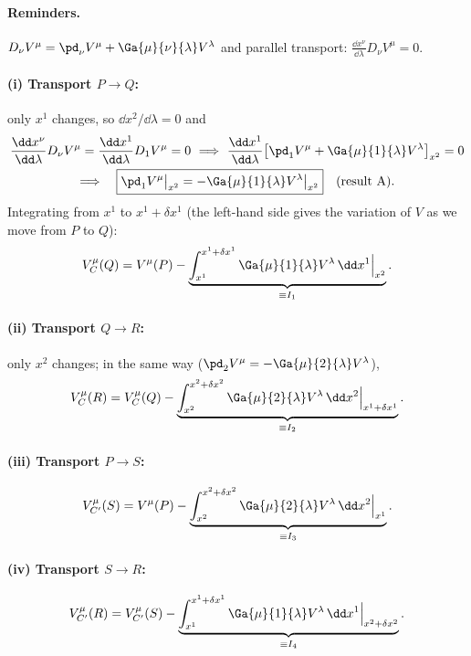 \paragraph{Reminders.} $D_\nu V^\mu=\pd_\nu V^\mu+\Ga{\mu}{\nu}{\lambda}V^\lambda$ and parallel transport: $\frac{\dd x^\nu}{\dd\lambda}D_\nu V^\mu=0$.

\paragraph{(i) Transport $P\to Q$:} only $x^1$ changes, so $\dd x^2/\dd\lambda=0$ and
\begin{gather*}
  \frac{\dd x^\nu}{\dd\lambda}D_\nu V^\mu=\frac{\dd x^1}{\dd\lambda}D_1V^\mu=0\ \Longrightarrow\ \frac{\dd x^1}{\dd\lambda}\big[\pd_1V^\mu+\Ga{\mu}{1}{\lambda}V^\lambda\big]_{x^2}=0\\
  \Longrightarrow\quad \boxed{\pd_1V^\mu\big|_{x^2}=-\Ga{\mu}{1}{\lambda}V^\lambda\big|_{x^2}}\quad\text{(result A)}.
\end{gather*}
Integrating from $x^1$ to $x^1+\delta x^1$ (the left-hand side gives the variation of $V$ as we move from $P$ to $Q$):
\begin{equation}
  V_C^\mu(Q)=V^\mu(P)-\underbrace{\int_{x^1}^{x^1+\delta x^1}\Ga{\mu}{1}{\lambda}V^\lambda\,\dd x^1\Big|_{x^2}}_{\equiv I_1}.
\end{equation}
\paragraph{(ii) Transport $Q\to R$:} only $x^2$ changes; in the same way ($\pd_2V^\mu=-\Ga{\mu}{2}{\lambda}V^\lambda$),
\begin{equation}
  V_C^\mu(R)=V_C^\mu(Q)-\underbrace{\int_{x^2}^{x^2+\delta x^2}\Ga{\mu}{2}{\lambda}V^\lambda\,\dd x^2\Big|_{x^1+\delta x^1}}_{\equiv I_2}.
\end{equation}
\paragraph{(iii) Transport $P\to S$:}
\begin{equation}
  V_{C'}^\mu(S)=V^\mu(P)-\underbrace{\int_{x^2}^{x^2+\delta x^2}\Ga{\mu}{2}{\lambda}V^\lambda\,\dd x^2\Big|_{x^1}}_{\equiv I_3}.
\end{equation}
\paragraph{(iv) Transport $S\to R$:}
\begin{equation}
  V_{C'}^\mu(R)=V_{C'}^\mu(S)-\underbrace{\int_{x^1}^{x^1+\delta x^1}\Ga{\mu}{1}{\lambda}V^\lambda\,\dd x^1\Big|_{x^2+\delta x^2}}_{\equiv I_4}.
\end{equation}

